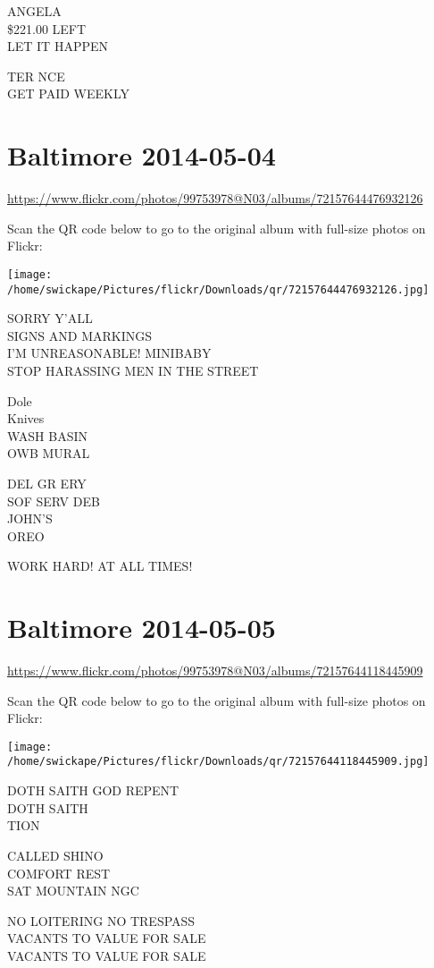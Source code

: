 \documentclass[10pt,letterpaper]{article}
\begin{document}
ANGELA\\
\$221.00 LEFT\\
LET IT HAPPEN

TER NCE\\
GET PAID WEEKLY
\pagebreak

\section*{Baltimore 2014-05-04}

\url{https://www.flickr.com/photos/99753978@N03/albums/72157644476932126}

Scan the QR code below to go to the original album with full-size photos on Flickr:

\texttt{[image: /home/swickape/Pictures/flickr/Downloads/qr/72157644476932126.jpg]}
\pagebreak

SORRY Y'ALL\\
SIGNS AND MARKINGS\\
I'M UNREASONABLE! MINIBABY\\
STOP HARASSING MEN IN THE STREET

Dole\\
Knives\\
WASH BASIN\\
OWB MURAL

DEL GR ERY\\
SOF SERV DEB\\
JOHN'S\\
OREO

WORK HARD!  AT ALL TIMES!
\pagebreak

\section*{Baltimore 2014-05-05}

\url{https://www.flickr.com/photos/99753978@N03/albums/72157644118445909}

Scan the QR code below to go to the original album with full-size photos on Flickr:

\texttt{[image: /home/swickape/Pictures/flickr/Downloads/qr/72157644118445909.jpg]}
\pagebreak

DOTH SAITH GOD REPENT\\
DOTH SAITH\\
TION

CALLED SHINO\\
COMFORT REST\\
SAT MOUNTAIN NGC

NO LOITERING NO TRESPASS\\
VACANTS TO VALUE FOR SALE\\
VACANTS TO VALUE FOR SALE
\end{document}
